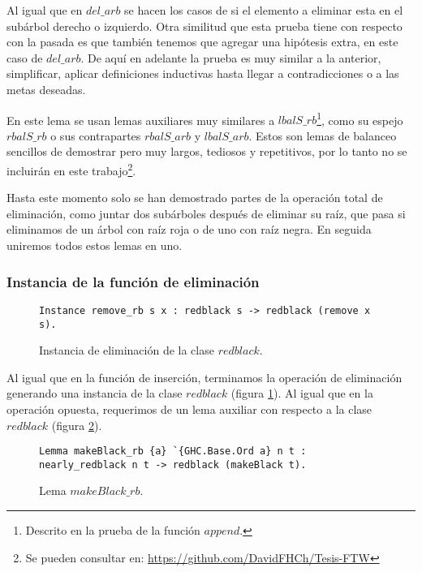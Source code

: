 Al igual que en \hyperref[lema_6]{$del\_arb$} se hacen los casos de si el elemento a eliminar esta 
en el subárbol derecho o izquierdo. Otra similitud que esta prueba tiene con respecto con la pasada 
es que también tenemos que agregar una hipótesis extra, en este caso de 
\hyperref[lema_6]{$del\_arb$}. De aquí en adelante la prueba es muy similar a la anterior, 
simplificar, aplicar definiciones inductivas hasta llegar a contradicciones o a las metas deseadas.

En este lema se usan lemas auxiliares muy similares a $lbalS\_rb$\footnote{Descrito en la prueba de
la  funci\'on \hyperref[func_app]{$append$}.}, como su espejo $rbalS\_rb$ o sus contrapartes 
$rbalS\_arb$ y $lbalS\_arb$. Estos son lemas de balanceo sencillos de demostrar pero muy largos, 
tediosos y repetitivos, por lo tanto no se incluirán en este trabajo\footnote{Se pueden consultar 
en: \url{https://github.com/DavidFHCh/Tesis-FTW}}.

Hasta este momento solo se han demostrado partes de la operación total de eliminación, como juntar
dos subárboles despu\'es de eliminar su ra\'iz, que pasa si eliminamos de un árbol con raíz roja o
de uno con raíz negra. En seguida uniremos todos estos lemas en uno.

\subsubsection{Instancia de la funci\'on de eliminaci\'on}

\begin{figure}[!ht]
\centering
\captionsetup{justification=centering}
\begin{verbatim}
Instance remove_rb s x : redblack s -> redblack (remove x s).
\end{verbatim}
\caption{Instancia de eliminaci\'on de la clase \hyperref[class_rb]{$redblack$}.}
\label{instance_del}
\end{figure}


Al igual que en la funci\'on de inserción, terminamos la operación de eliminaci\'on generando una
instancia de la clase \hyperref[class_rb]{$redblack$} (figura \ref{instance_del}). Al igual que en la 
operación opuesta, requerimos de un lema auxiliar con respecto a la clase 
\hyperref[class_rb]{$redblack$} (figura \ref{lema_7}).

\begin{figure}[!ht]
\centering
\captionsetup{justification=centering}
\begin{verbatim}
Lemma makeBlack_rb {a} `{GHC.Base.Ord a} n t :
nearly_redblack n t -> redblack (makeBlack t).
\end{verbatim}
\caption{Lema $makeBlack\_rb$.}
\label{lema_7}
\end{figure}


